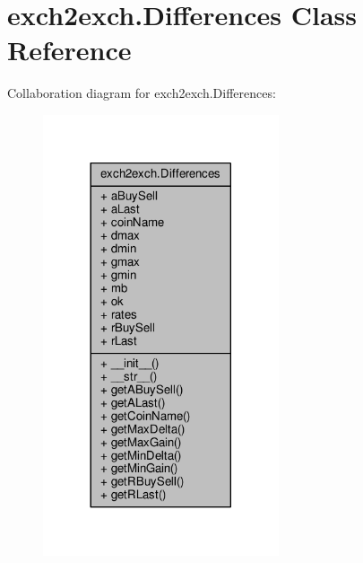 \hypertarget{classexch2exch_1_1_differences}{}\section{exch2exch.\+Differences Class Reference}
\label{classexch2exch_1_1_differences}


Collaboration diagram for exch2exch.\+Differences\+:\nopagebreak
\begin{figure}[H]
\begin{center}
\leavevmode
\includegraphics[width=197pt]{classexch2exch_1_1_differences__coll__graph}
\end{center}
\end{figure}
